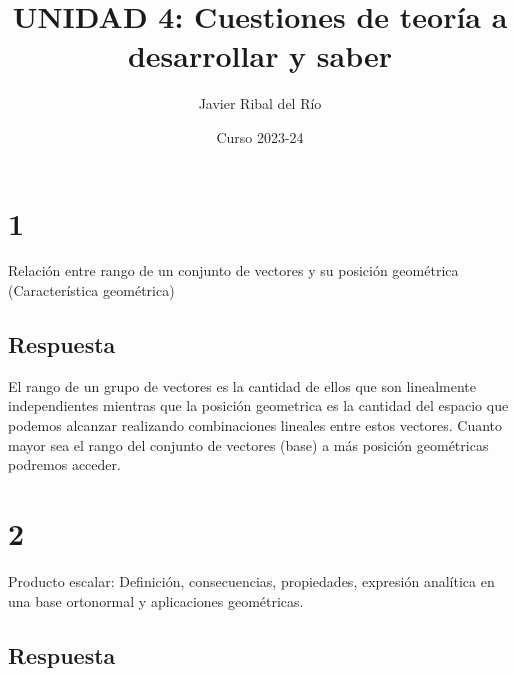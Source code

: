 \documentclass[
	12pt, %
	spanish, %
]{fphw}
\title{UNIDAD 4: Cuestiones de teoría a desarrollar y saber} %
\author{Javier Ribal del Río} %
\date{Curso 2023-24}
\institute{Colegio Salesianos San Juan Bosco} %
\begin{document}
\maketitle %


\section*{1}

\begin{problem}
	Relación entre rango de un conjunto de vectores y su posición geométrica
	(Característica geométrica)\end{problem}



\subsection*{Respuesta} El rango de un grupo de vectores es la cantidad de ellos que son linealmente independientes mientras que la posición geometrica es la cantidad del espacio que podemos alcanzar realizando combinaciones lineales entre estos vectores. Cuanto mayor sea el rango del conjunto de vectores (base) a más posición geométricas podremos acceder.


\section*{2}

\begin{problem}
	Producto escalar: Definición, consecuencias, propiedades, expresión analítica
	en una base ortonormal y aplicaciones geométricas.	
	
\end{problem}


\subsection*{Respuesta}
\end{document}
